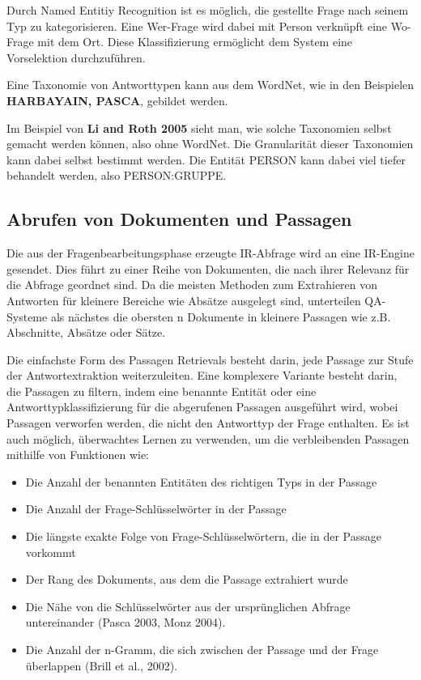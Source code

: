 \documentclass[
        ngerman,
        paper=a4,
        numbers=noendperiod,
]{scrreprt}
\begin{document}
Durch Named Entitiy Recognition ist es möglich, die gestellte Frage nach seinem Typ zu kategorisieren. Eine \glqq Wer-Frage\grqq{} wird dabei mit Person verknüpft eine \glqq Wo-Frage\grqq{} mit dem Ort. Diese Klassifizierung ermöglicht dem System eine Vorselektion durchzuführen. 

Eine \glqq Taxonomie\grqq{} von Antworttypen kann aus dem WordNet, wie in den Beispielen \textbf{HARBAYAIN, PASCA}, gebildet werden.

Im Beispiel von \textbf{Li and Roth 2005} sieht man, wie solche Taxonomien selbst gemacht werden können, also ohne WordNet. Die Granularität dieser Taxonomien kann dabei selbst bestimmt werden. Die Entität PERSON kann dabei viel tiefer behandelt werden, also PERSON:GRUPPE. 


\subsection{Abrufen von Dokumenten und Passagen}
Die aus der Fragenbearbeitungsphase erzeugte IR-Abfrage wird an eine IR-Engine gesendet.
Dies führt zu einer Reihe von Dokumenten, die nach ihrer Relevanz für die Abfrage geordnet sind. Da die meisten Methoden zum Extrahieren von Antworten für kleinere Bereiche wie Absätze ausgelegt sind, unterteilen QA-Systeme als nächstes die obersten n Dokumente in kleinere Passagen wie z.B. Abschnitte, Absätze oder Sätze. 


Die einfachste Form des Passagen Retrievals besteht darin, jede Passage zur Stufe der Antwortextraktion weiterzuleiten. Eine komplexere Variante besteht darin, die Passagen zu filtern, indem eine benannte Entität oder eine Antworttypklassifizierung für die abgerufenen Passagen ausgeführt wird, wobei Passagen verworfen werden, die nicht den Antworttyp der Frage enthalten. Es ist auch möglich, überwachtes Lernen zu verwenden, um die verbleibenden Passagen mithilfe von Funktionen wie:

\begin{itemize}
\item Die Anzahl der benannten Entitäten des richtigen Typs in der Passage
\item Die Anzahl der Frage-Schlüsselwörter in der Passage 
\item Die längste exakte Folge von Frage-Schlüsselwörtern, die in der Passage vorkommt
\item Der Rang des Dokuments, aus dem die Passage extrahiert wurde
\item Die Nähe von die Schlüsselwörter aus der ursprünglichen Abfrage untereinander (Pasca 2003, Monz 2004).
\item Die Anzahl der n-Gramm, die sich zwischen der Passage und der Frage überlappen (Brill et al., 2002).
\end{itemize}
\end{document}
